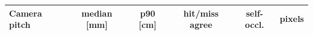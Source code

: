 \begin{tabular}{lccccc}\toprule
Camera pitch & median [mm] & p90 [cm] & hit/miss agree & self-occl. & pixels\\\midrule

\bottomrule\end{tabular}
